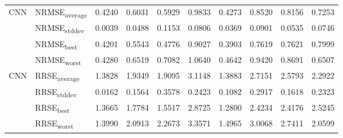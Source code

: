 {\begin{longtable}{l l c c c c c c c c}
\cmidrule(lr){2-10}
\multirow{4}{*}{CNN} & NRMSE\textsubscript{average} & 0.4240 & 0.6031 & 0.5929 & 0.9833 & 0.4273 & 0.8520 & 0.8156 & 0.7253 \\
 & NRMSE\textsubscript{stddev} & 0.0039 & 0.0488 & 0.1153 & 0.0806 & 0.0369 & 0.0901 & 0.0535 & 0.0746 \\
 & NRMSE\textsubscript{best} & 0.4201 & 0.5543 & 0.4776 & 0.9027 & 0.3903 & 0.7619 & 0.7621 & 0.7999 \\
 & NRMSE\textsubscript{worst} & 0.4280 & 0.6519 & 0.7082 & 1.0640 & 0.4642 & 0.9420 & 0.8691 & 0.6507 \\
\cmidrule(lr){2-10}
\multirow{4}{*}{CNN} & RRSE\textsubscript{average} & 1.3828 & 1.9349 & 1.9095 & 3.1148 & 1.3883 & 2.7151 & 2.5793 & 2.2922 \\
 & RRSE\textsubscript{stddev} & 0.0162 & 0.1564 & 0.3578 & 0.2423 & 0.1082 & 0.2917 & 0.1618 & 0.2323 \\
 & RRSE\textsubscript{best} & 1.3665 & 1.7784 & 1.5517 & 2.8725 & 1.2800 & 2.4234 & 2.4176 & 2.5245 \\
 & RRSE\textsubscript{worst} & 1.3990 & 2.0913 & 2.2673 & 3.3571 & 1.4965 & 3.0068 & 2.7411 & 2.0599 \\
\cmidrule(lr){2-10}
\end{longtable}
}